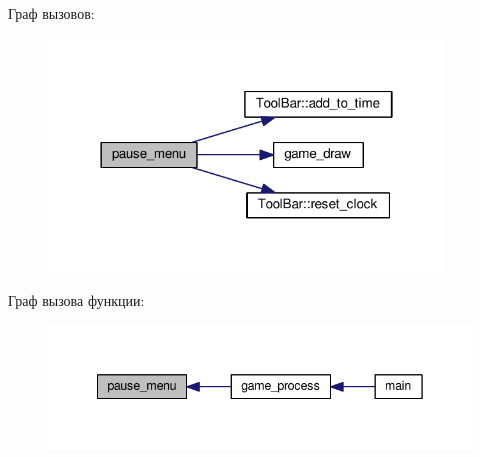 Граф вызовов\+:\nopagebreak
\begin{figure}[H]
\begin{center}
\leavevmode
\includegraphics[width=298pt]{group__menu_ga41b04beddc9426c2999858fabc479ac0_cgraph}
\end{center}
\end{figure}




Граф вызова функции\+:\nopagebreak
\begin{figure}[H]
\begin{center}
\leavevmode
\includegraphics[width=342pt]{group__menu_ga41b04beddc9426c2999858fabc479ac0_icgraph}
\end{center}
\end{figure}


